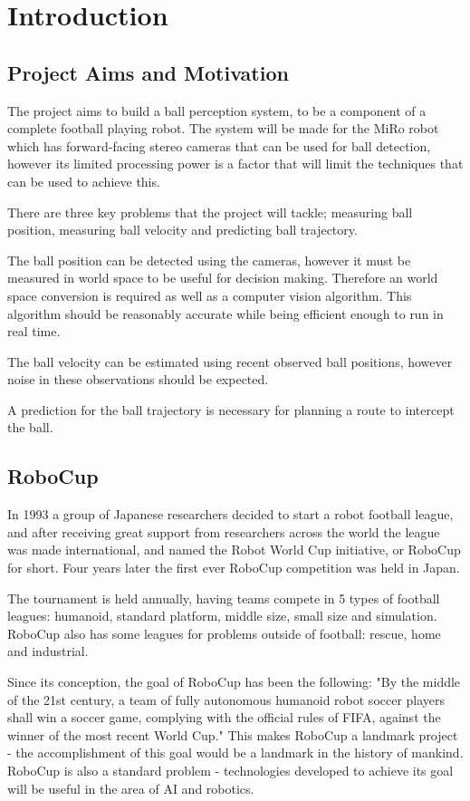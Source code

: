 \chapter{Introduction}

\section{Project Aims and Motivation}

The project aims to build a ball perception system, to be a component of a complete football playing  robot. The system will be made for the MiRo robot which has forward-facing stereo cameras that can be used for ball detection, however its limited processing power is a factor that will limit the techniques that can be used to achieve this. 

There are three key problems that the project will tackle; measuring ball position, measuring ball velocity and predicting ball trajectory. 

The ball position can be detected using the cameras, however it must be measured in world space to be useful for decision making. Therefore an world space conversion is required as well as a computer vision algorithm. This algorithm should be reasonably accurate while being efficient enough to run in real time.

The ball velocity can be estimated using recent observed ball positions, however noise in these observations should be expected. 

A prediction for the ball trajectory is necessary for planning a route to intercept the ball. 

\section{RoboCup}

In 1993 a group of Japanese researchers decided to start a robot football league, and after receiving great support from researchers across the world the league was made international, and named the Robot World Cup initiative, or RoboCup for short. Four years later the first ever RoboCup competition was held in Japan. 

The tournament is held annually, having teams compete in 5 types of football leagues: humanoid, standard platform, middle size, small size and simulation. RoboCup also has some leagues for problems outside of football: rescue, home and industrial.

Since its conception, the goal of RoboCup has been the following: "By the middle of the 21st century, a team of fully autonomous humanoid robot soccer players shall win a soccer game, complying with the official rules of FIFA, against the winner of the most recent World Cup." This makes RoboCup a landmark project - the accomplishment of this goal would be a landmark in the history of mankind. RoboCup is also a standard problem - technologies developed to achieve its goal will be useful in the area of AI and robotics.

